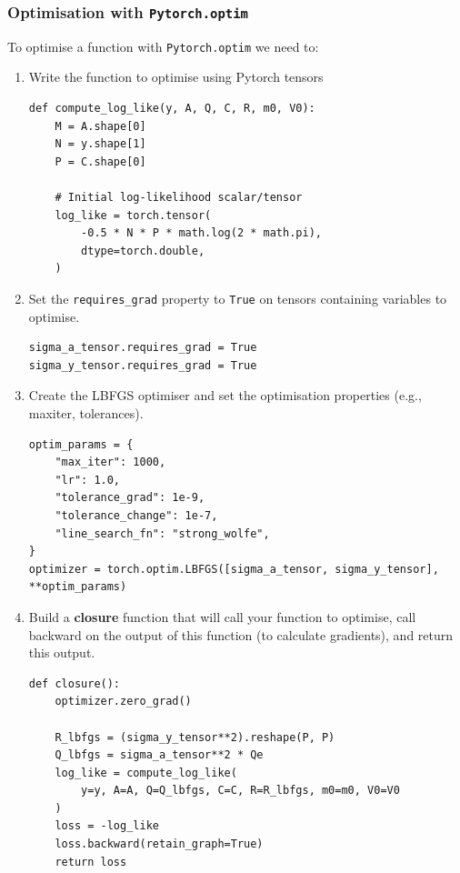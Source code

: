 \begin{frame}
    \frametitle{Optimisation with \texttt{Pytorch.optim}}

	To optimise a function with \texttt{Pytorch.optim} we need to:

	\begin{enumerate}

		\item Write the function to optimise using Pytorch tensors

			\begin{lstlisting}
def compute_log_like(y, A, Q, C, R, m0, V0):
    M = A.shape[0]
    N = y.shape[1]
    P = C.shape[0]

    # Initial log-likelihood scalar/tensor
    log_like = torch.tensor(
        -0.5 * N * P * math.log(2 * math.pi),
        dtype=torch.double,
    )
			\end{lstlisting}

		\item Set the \texttt{requires\_grad} property to \texttt{True} on tensors containing variables to optimise.

			\begin{lstlisting}
sigma_a_tensor.requires_grad = True
sigma_y_tensor.requires_grad = True
			\end{lstlisting}

		\item Create the LBFGS optimiser and set the optimisation properties (e.g., maxiter, tolerances).

			\begin{lstlisting}
optim_params = {
    "max_iter": 1000,
    "lr": 1.0,
    "tolerance_grad": 1e-9,
    "tolerance_change": 1e-7,
    "line_search_fn": "strong_wolfe",
}
optimizer = torch.optim.LBFGS([sigma_a_tensor, sigma_y_tensor], **optim_params)
			\end{lstlisting}

		\item Build a \textbf{closure} function that will call your function to
optimise, call backward on the output of this function (to calculate
gradients), and return this output.

			\begin{lstlisting}
def closure():
    optimizer.zero_grad()

    R_lbfgs = (sigma_y_tensor**2).reshape(P, P)
    Q_lbfgs = sigma_a_tensor**2 * Qe
    log_like = compute_log_like(
        y=y, A=A, Q=Q_lbfgs, C=C, R=R_lbfgs, m0=m0, V0=V0
    )
    loss = -log_like
    loss.backward(retain_graph=True)
    return loss
			\end{lstlisting}


\end{enumerate}
\end{frame}
